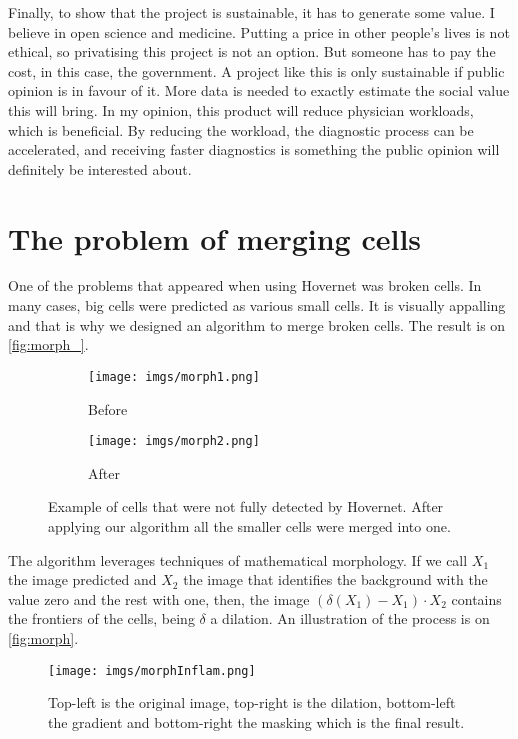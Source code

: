 Finally, to show that the project is sustainable, it has to generate some value. I believe in open science and medicine. Putting a price in other people's lives is not ethical, so privatising this project is not an option. But someone has to pay the cost, in this case, the government. A project like this is only sustainable if public opinion is in favour of it. More data is needed to exactly estimate the social value this will bring. In my opinion, this product will reduce physician workloads, which is beneficial. By reducing the workload, the diagnostic process can be accelerated, and receiving faster diagnostics is something the public opinion will definitely be interested about.

\chapter{The problem of merging cells}\label{sec:merge_cells}

One of the problems that appeared when using Hovernet was broken cells. In many cases, big cells were predicted as various small cells. It is visually appalling and that is why we designed an algorithm to merge broken cells. The result is on \autoref{fig:morph_}.

\begin{figure}[ht]
\begin{subfigure}[b]{1\textwidth}
    \centering
    \texttt{[image: imgs/morph1.png]}
    \caption{Before}
    \label{fig:morph1}
\end{subfigure}
\begin{subfigure}[b]{1\textwidth}
    \centering
    \texttt{[image: imgs/morph2.png]}
    \caption{After}
    \label{fig:morph2}
\end{subfigure}
\caption{Example of cells that were not fully detected by Hovernet. After applying our algorithm all the smaller cells were merged into one.}
\label{fig:morph_}
\end{figure}

The algorithm leverages techniques of mathematical morphology. If we call $X_1$ the image predicted and $X_2$ the image that identifies the background with the value zero and the rest with one, then, the image $(\delta (X_1) - X_1)  \cdot X_2$ contains the frontiers of the cells, being $\delta$ a dilation. An illustration of the process is on \autoref{fig:morph}.

\begin{figure}[ht]
    \centering
    \texttt{[image: imgs/morphInflam.png]}
    \caption{Top-left is the original image, top-right is the dilation, bottom-left the gradient and bottom-right the masking which is the final result.}
    \label{fig:morph}
\end{figure}

